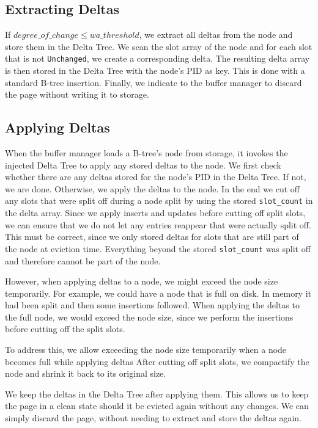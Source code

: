 \subsection*{Extracting Deltas}
If $degree\_of\_change \leq wa\_threshold$, we extract all deltas from the node and store them in the Delta Tree.
We scan the slot array of the node and for each slot that is not \texttt{Unchanged}, we create a corresponding delta.
The resulting delta array is then stored in the Delta Tree with the node's \ac{PID} as key.
This is done with a standard B-tree insertion.
Finally, we indicate to the buffer manager to discard the page without writing it to storage.

\subsection*{Applying Deltas}
When the buffer manager loads a B-tree's node from storage, it invokes the injected Delta Tree to apply any stored deltas to the node.
We first check whether there are any deltas stored for the node's \ac{PID} in the Delta Tree.
If not, we are done.
Otherwise, we apply the deltas to the node.
In the end we cut off any slots that were split off during a node split by using the stored \texttt{slot\_count} in the delta array.
Since we apply inserts and updates before cutting off split slots, we can ensure that we do not let any entries reappear that were actually split off. 
This must be correct, since we only stored deltas for slots that are still part of the node at eviction time.
Everything beyond the stored \texttt{slot\_count} was split off and therefore cannot be part of the node.

However, when applying deltas to a node, we might exceed the node size temporarily.
For example, we could have a node that is full on disk. 
In memory it had been split and then some insertions followed. 
When applying the deltas to the full node, we would exceed the node size, since we perform the insertions before cutting off the split slots.

To address this, we allow exceeding the node size temporarily when a node becomes full while applying deltas
After cutting off split slots, we compactify the node and shrink it back to its original size.

We keep the deltas in the Delta Tree after applying them.
This allows us to keep the page in a clean state should it be evicted again without any changes.
We can simply discard the page, without needing to extract and store the deltas again.

